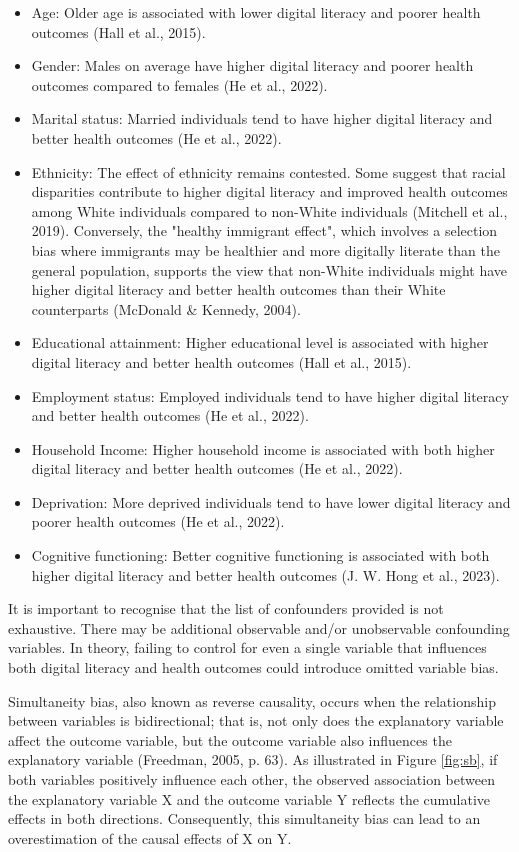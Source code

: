 \begin{itemize}
    \item Age: Older age is associated with lower digital literacy and poorer health outcomes (Hall et al., 2015).
    \item Gender: Males on average have higher digital literacy and poorer health outcomes compared to females (He et al., 2022).
    \item Marital status: Married individuals tend to have higher digital literacy and better health outcomes (He et al., 2022).
    \item Ethnicity: The effect of ethnicity remains contested. Some suggest that racial disparities contribute to higher digital literacy and improved health outcomes among White individuals compared to non-White individuals (Mitchell et al., 2019). Conversely, the "healthy immigrant effect", which involves a selection bias where immigrants may be healthier and more digitally literate than the general population, supports the view that non-White individuals might have higher digital literacy and better health outcomes than their White counterparts (McDonald \& Kennedy, 2004).
    \item Educational attainment: Higher educational level is associated with higher digital literacy and better health outcomes (Hall et al., 2015).
    \item Employment status: Employed individuals tend to have higher digital literacy and better health outcomes (He et al., 2022). 
    \item Household Income: Higher household income is associated with both higher digital literacy and better health outcomes (He et al., 2022).
    \item Deprivation: More deprived individuals tend to have lower digital literacy and poorer health outcomes (He et al., 2022).
    \item Cognitive functioning: Better cognitive functioning is associated with both higher digital literacy and better health outcomes (J. W. Hong et al., 2023).
\end{itemize}

It is important to recognise that the list of confounders provided is not exhaustive. There may be additional observable and/or unobservable confounding variables. In theory, failing to control for even a single variable that influences both digital literacy and health outcomes could introduce omitted variable bias.

Simultaneity bias, also known as reverse causality, occurs when the relationship between variables is bidirectional; that is, not only does the explanatory variable affect the outcome variable, but the outcome variable also influences the explanatory variable (Freedman, 2005, p. 63). As illustrated in Figure \ref{fig:sb}, if both variables positively influence each other, the observed association between the explanatory variable X and the outcome variable Y reflects the cumulative effects in both directions. Consequently, this simultaneity bias can lead to an overestimation of the causal effects of X on Y. 

